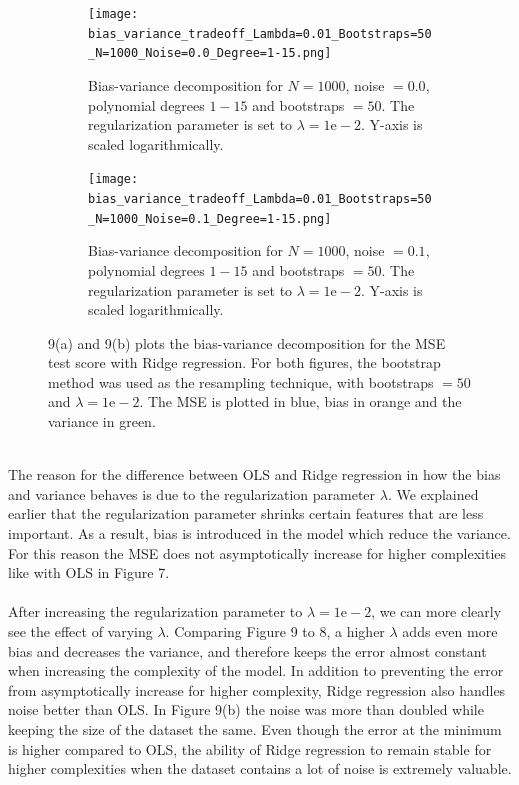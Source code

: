 \documentclass[a4paper,twocolumn]{article}
\begin{document}
\begin{figure}[ht]
    \centering
    \begin{subfigure}[b]{0.9\columnwidth}
        \texttt{[image: bias\_variance\_tradeoff\_Lambda=0.01\_Bootstraps=50\_N=1000\_Noise=0.0\_Degree=1-15.png]}
        \caption{Bias-variance decomposition for $N = 1000$, noise $= 0.0$, polynomial degrees $1- 15$ and bootstraps $= 50$. The regularization parameter is set to $\lambda = 1\textrm{e}-2$. Y-axis is scaled logarithmically.}
    \end{subfigure}
    
    \begin{subfigure}[b]{0.9\columnwidth}
        \texttt{[image: bias\_variance\_tradeoff\_Lambda=0.01\_Bootstraps=50\_N=1000\_Noise=0.1\_Degree=1-15.png]}
        \caption{Bias-variance decomposition for $N = 1000$, noise $= 0.1$, polynomial degrees $1- 15$ and bootstraps $= 50$. The regularization parameter is set to $\lambda = 1\textrm{e}-2$. Y-axis is scaled logarithmically.}
    \end{subfigure}
    \caption{9(a) and 9(b) plots the bias-variance decomposition for the MSE test score with Ridge regression. For both figures, the bootstrap method was used as the resampling technique, with bootstraps $= 50$ and $\lambda = 1\textrm{e}-2$. The MSE is plotted in blue, bias in orange and the variance in green. }
\end{figure}\\
The reason for the difference between OLS and Ridge regression in how the bias and variance behaves is due to the regularization parameter $\lambda$. We explained earlier that the regularization parameter shrinks certain features that are less important. As a result, bias is introduced in the model which reduce the variance. For this reason the MSE does not asymptotically increase for higher complexities like with OLS in Figure 7. \\
\\
After increasing the regularization parameter to $\lambda = 1\textrm{e}-2$, we can more clearly see the effect of varying $\lambda$. Comparing Figure 9 to 8, a higher $\lambda$ adds even more bias and decreases the variance, and therefore keeps the error almost constant when increasing the complexity of the model. In addition to preventing the error from asymptotically increase for higher complexity, Ridge regression also handles noise better than OLS. In Figure 9(b) the noise was more than doubled while keeping the size of the dataset the same. Even though the error at the minimum is higher compared to OLS, the ability of Ridge regression to remain stable for higher complexities when the dataset contains a lot of noise is extremely valuable.\\
\end{document}
